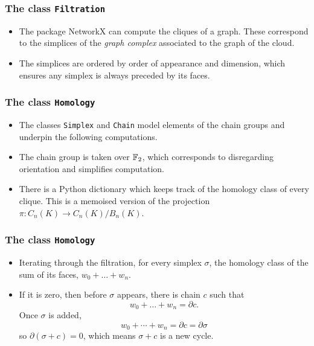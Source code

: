 \documentclass[xcolor=dvipsnames]{beamer}
\begin{document}
\begin{frame}
	\frametitle{The class \texttt{Filtration}}
	\begin{itemize}
		\item The package NetworkX can compute the cliques of a graph. These correspond to the
			simplices of the \emph{graph complex} associated to the \MKNN graph of the cloud.
			\pause
		\item The simplices are ordered by order of appearance and dimension, which ensures
			any simplex is always preceded by its faces. 
	\end{itemize}
\end{frame}

\begin{frame}
	\frametitle{The class \texttt{Homology}}
	\begin{itemize}
		\item The classes \texttt{Simplex} and \texttt{Chain} model elements of the chain
			groups and underpin the following computations. \pause
		\item The chain group is taken over \( \mathbb{F}_2 \), which corresponds to disregarding
			orientation and simplifies computation. \pause
		\item There is a Python dictionary which keeps track of the homology class of every
			clique. This is a memoised version of the projection \( \pi \colon C_n(K) \to
			C_n(K)/B_n(K) \). \pause
	\end{itemize}
\end{frame}

\begin{frame}
	\frametitle{The class \texttt{Homology}}
	\begin{itemize}
		\item Iterating through the filtration, for every simplex \( \sigma \), the homology
			class of the sum of its faces, \( w_0 + \dots + w_n \). \pause
			\item If it is zero, then before \( \sigma \) appears, there is chain \(
				c \) such that
				\begin{equation*}
					w_0 + \dots + w_n = \partial c.
				\end{equation*}
				\pause
				Once \( \sigma \) is added,
				\begin{equation*}
					w_0 + \cdots + w_n = \partial c = \partial \sigma
				\end{equation*}
			so \( \partial(\sigma + c) = 0 \), which means \( \sigma + c \) is a new cycle. 
	\end{itemize}
\end{frame}
\end{document}
